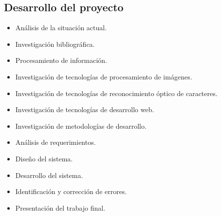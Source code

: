 \subsection{Desarrollo del proyecto}
\begin{itemize}
  \item Análisis de la situación actual.
  \item Investigación bibliográfica.
  \item Procesamiento de información.
  \item Investigación de tecnologías de procesamiento de imágenes.
  \item Investigación de tecnologías de reconocimiento óptico de caracteres.
  \item Investigación de tecnologías de desarrollo web.
  \item Investigación de metodologías de desarrollo.
  \item Análisis de requerimientos.
  \item Diseño del sistema.
  \item Desarrollo del sistema.
  \item Identificación y corrección de errores.
  \item Presentación del trabajo final.
\end{itemize}
